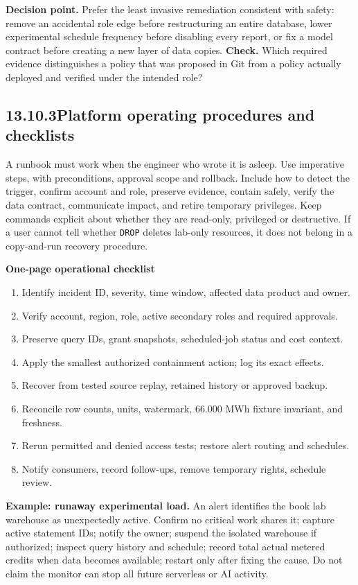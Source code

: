 \documentclass[11pt,twoside]{article}
\newcommand{\topic}[2]{\subsection*{#1\quad #2}}
\begin{document}
\textbf{Decision point.} Prefer the least invasive remediation consistent with safety: remove an accidental role edge before restructuring an entire database, lower experimental schedule frequency before disabling every report, or fix a model contract before creating a new layer of data copies.
\textbf{Check.} Which required evidence distinguishes a policy that was proposed in Git from a policy actually deployed and verified under the intended role?
\newpage
\topic{13.10.3}{Platform operating procedures and checklists}
A runbook must work when the engineer who wrote it is asleep. Use imperative steps, with preconditions, approval scope and rollback. Include how to detect the trigger, confirm account and role, preserve evidence, contain safely, verify the data contract, communicate impact, and retire temporary privileges. Keep commands explicit about whether they are read-only, privileged or destructive. If a user cannot tell whether \texttt{DROP} deletes lab-only resources, it does not belong in a copy-and-run recovery procedure.
\begin{whitebox}\textbf{One-page operational checklist}\par
\begin{enumerate}
\item Identify incident ID, severity, time window, affected data product and owner.
\item Verify account, region, role, active secondary roles and required approvals.
\item Preserve query IDs, grant snapshots, scheduled-job status and cost context.
\item Apply the smallest authorized containment action; log its exact effects.
\item Recover from tested source replay, retained history or approved backup.
\item Reconcile row counts, units, watermark, 66.000 MWh fixture invariant, and freshness.
\item Rerun permitted and denied access tests; restore alert routing and schedules.
\item Notify consumers, record follow-ups, remove temporary rights, schedule review.
\end{enumerate}
\end{whitebox}
\textbf{Example: runaway experimental load.} An alert identifies the book lab warehouse as unexpectedly active. Confirm no critical work shares it; capture active statement IDs; notify the owner; suspend the isolated warehouse if authorized; inspect query history and schedule; record total actual metered credits when data becomes available; restart only after fixing the cause. Do not claim the monitor can stop all future serverless or AI activity.
\end{document}
